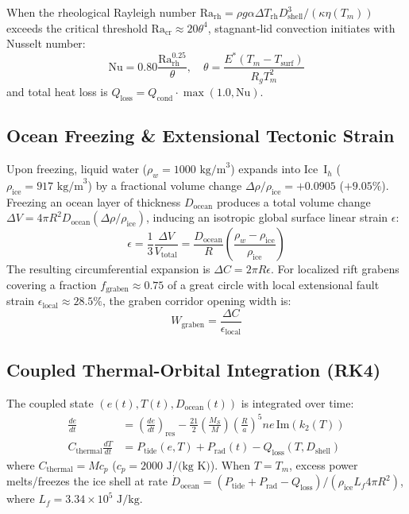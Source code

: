 \documentclass[11pt,a4paper]{article}
\begin{document}
When the rheological Rayleigh number $\mathrm{Ra}_{\text{rh}} = \rho g \alpha \Delta T_{\text{rh}} D_{\text{shell}}^3 / (\kappa \eta(T_m))$ exceeds the critical threshold $\mathrm{Ra}_{\text{cr}} \approx 20 \theta^4$, stagnant-lid convection initiates with Nusselt number:
\begin{equation}
\mathrm{Nu} = 0.80 \frac{\mathrm{Ra}_{\text{rh}}^{0.25}}{\theta}, \quad \theta = \frac{E^* (T_m - T_{\text{surf}})}{R_g T_m^2}
\end{equation}
and total heat loss is $Q_{\text{loss}} = Q_{\text{cond}} \cdot \max(1.0, \mathrm{Nu})$.

\subsection{Ocean Freezing \& Extensional Tectonic Strain}
Upon freezing, liquid water ($\rho_w = 1000\text{ kg/m}^3$) expands into Ice~$\mathrm{I}_h$ ($\rho_{\text{ice}} = 917\text{ kg/m}^3$) by a fractional volume change $\Delta \rho / \rho_{\text{ice}} = +0.0905$ ($+9.05\%$). Freezing an ocean layer of thickness $D_{\text{ocean}}$ produces a total volume change $\Delta V = 4\pi R^2 D_{\text{ocean}} (\Delta \rho / \rho_{\text{ice}})$, inducing an isotropic global surface linear strain $\epsilon$:
\begin{equation}
\epsilon = \frac{1}{3} \frac{\Delta V}{V_{\text{total}}} = \frac{D_{\text{ocean}}}{R} \left(\frac{\rho_w - \rho_{\text{ice}}}{\rho_{\text{ice}}}\right)
\end{equation}
The resulting circumferential expansion is $\Delta C = 2\pi R \epsilon$. For localized rift grabens covering a fraction $f_{\text{graben}} \approx 0.75$ of a great circle with local extensional fault strain $\epsilon_{\text{local}} \approx 28.5\%$, the graben corridor opening width is:
\begin{equation}
W_{\text{graben}} = \frac{\Delta C}{\epsilon_{\text{local}}}
\end{equation}

\subsection{Coupled Thermal-Orbital Integration (RK4)}
The coupled state $(e(t), T(t), D_{\text{ocean}}(t))$ is integrated over time:
\begin{align}
\frac{de}{dt} &= \left(\frac{de}{dt}\right)_{\text{res}} - \frac{21}{2} \left(\frac{M_S}{M}\right) \left(\frac{R}{a}\right)^5 n e\, \mathrm{Im}(k_2(T)) \\
C_{\text{thermal}} \frac{dT}{dt} &= P_{\text{tide}}(e, T) + P_{\text{rad}}(t) - Q_{\text{loss}}(T, D_{\text{shell}})
\end{align}
where $C_{\text{thermal}} = M c_p$ ($c_p = 2000\text{ J/(kg K)}$). When $T = T_m$, excess power melts/freezes the ice shell at rate $\dot{D}_{\text{ocean}} = (P_{\text{tide}} + P_{\text{rad}} - Q_{\text{loss}}) / (\rho_{\text{ice}} L_f 4\pi R^2)$, where $L_f = 3.34 \times 10^5\text{ J/kg}$.
\end{document}
